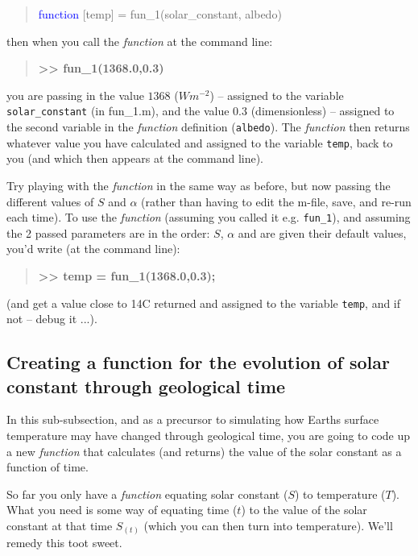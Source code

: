 \documentclass{tufte-book} %
\newenvironment{docspec}{\begin{quotation}\ttfamily\parskip0pt\parindent0pt\ignorespaces}{\end{quotation}}
\newenvironment{docspecbold}{\begin{quotation}\ttfamily\bfseries\parskip0pt\parindent0pt\ignorespaces}{\end{quotation}}
\begin{document}
\begin{docspec}
\textcolor{blue}{function} [temp] = fun\_1(solar\_constant, albedo)
\end{docspec}
then when you call the \textit{function}  at the command line:
\begin{docspecbold}
>> fun\_1(1368.0,0.3)
\end{docspecbold}
you are passing in the value \(1368\) (\(Wm^{-2}\)) -- assigned to the variable \texttt{solar\_constant} (in \textsf{fun\_1.m}), and the value \(0.3\) (dimensionless) --  assigned to the second variable in the \textit{function} definition (\texttt{albedo}). The \textit{function} then returns whatever value you have calculated and assigned to the variable \texttt{temp}, back to you (and which then appears at the command line).

Try playing with the \textit{function} in the same way as before, but now passing the different values of \(S\) and \(\alpha\) (rather than having to edit the \textsf{m-file}, save, and re-run each time). To use the \textit{function} (assuming you called it e.g. \texttt{fun\_1}), and assuming the 2 passed parameters are in the order: \(S\), \(\alpha\) and are given their default values, you'd write (at the command line):
\begin{docspecbold}
>> temp = fun\_1(1368.0,0.3);
\end{docspecbold}
(and get a value close to 14\degree C returned and assigned to the variable \texttt{temp}, and if not -- debug it ...).


\newpage

\subsection{Creating a function for the evolution of solar constant through geological time}

In this  sub-subsection, and as a precursor to simulating how Earths surface temperature may have changed through geological time, you are going to code up a new \textit{function} that calculates (and returns) the value of the solar constant as a function of time.

So far you only have a \textit{function} equating solar constant (\(S\)) to temperature (\(T\)). What you need is some way of equating time (\(t\)) to the value of the solar constant at that time \(S_{(t)}\) (which you can then turn into temperature). We'll remedy this toot sweet.
\end{document}
